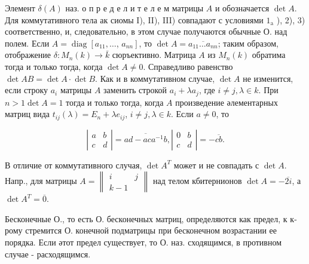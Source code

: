 \documentclass[10pt]{article}
\begin{document}
Элемент $\delta(A)$ наз. о п р е д е л и т е л е м матрицы $A$ и обозначается $\operatorname{det} A$. Для коммутативного тела ак сиомы I), II), III) совпадают с условиями $1_{\mathrm{a}}$ ), 2), 3) соответственно, и, следовательно, в этом случае получаются обычные О. над полем. Если $A=\operatorname{diag}\left[a_{11}, \ldots\right.$, $\left.a_{n n}\right]$, то $\operatorname{det} A=\overline{a_{11} \ldots a_{n n}}$; таким образом, отображение $\delta: M_{n}(k) \rightarrow \bar{k}$ сюръективно. Матрица $A$ из $M_{n}(k)$ обратима тогда и только тогда, когда $\operatorname{det} A \neq 0$. Справедливо равенство $\operatorname{det} A B=\operatorname{det} A \cdot \operatorname{det} B$. Как и в коммутативном случае, $\operatorname{det} A$ не изменится, если строку $a_{i}$ матрицы $A$ заменить строкой $a_{i}+\lambda a_{j}$, где $i \neq j, \lambda \in k$. При $n>1 \operatorname{det} A=1$ тогда и только тогда, когда $A$ произведение әлементарных матриц вида $t_{i j}(\lambda)=E_{n}+\lambda e_{i j}$, $i \neq j, \lambda \in k$. Если $a \neq 0$, то



\[

\left|\begin{array}{ll}

a & b \\

c & d

\end{array}\right|=\overline{a d-a c a^{-1} b},\left|\begin{array}{ll}

0 & b \\

c & d

\end{array}\right|=-\overline{c b} .

\]



В отличие от коммутативного случая, $\operatorname{det} A^{T}$ может и не совпадать с $\operatorname{det} A$. Напр., для матрицы $A=\left\|\begin{array}{cc}i & j \\ k-1\end{array}\right\|$ над телом кбитернионов $\operatorname{det} A=-\overline{2 i}$, а $\operatorname{det} A^{T}=\overline{0}$.



Бесконечные О., то есть О. бесконечных матриц, определяются как предел, к к-рому стремится О. конечной подматрицы при бесконечном возрастании ее порядка. Если әтот предел существует, то О. наз. сходящимся, в противном случае - расходящимся.
\end{document}
